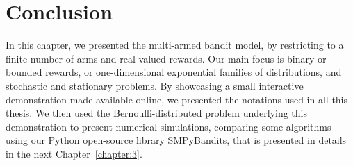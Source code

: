 % 




\section{Conclusion}
\label{sec:2:conclusion}

In this chapter, we presented the multi-armed bandit model, by restricting to a finite number of arms and real-valued rewards.
Our main focus is binary or bounded rewards, or one-dimensional exponential families of distributions, and stochastic and stationary problems.
By showcasing a small interactive demonstration made available online,
we presented the notations used in all this thesis.
%
We then used the Bernoulli-distributed problem underlying this demonstration
to present numerical simulations, comparing some algorithms using our Python open-source library SMPyBandits, that is presented in details in the next Chapter~\ref{chapter:3}.

